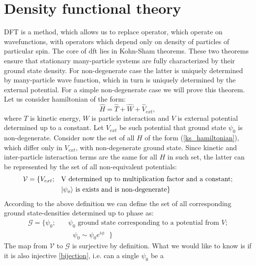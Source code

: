 \documentclass[openany, longbibliography,slovene,a4paper,12pt]{article}
\begin{document}
\section{Density functional theory}
DFT is a method, which allows us to replace operator, which operate on
wavefunctions, with operators which depend only on density of particles of
particular spin. The core of dft lies in Kohn-Sham theorems. These two theorems
ensure that stationary many-particle systems are fully characterized by their
ground state density. For non-degenerate case the latter is uniquely determined
by many-particle wave function, which in turn is uniquely determined by the
external potential. For a simple non-degenerate case we will prove this theorem. Let us consider hamiltonian of the form:
\begin{equation} \label{ks_hamiltonian}
\hat H = \hat T + \hat W + \hat V_{ext},
\end{equation}
where $T$ is kinetic energy, $W$ is particle interaction and $V$ is external
potential determined up to a constant. Let $V_{ext}$ be such potential that
ground state $\psi_0$ is non-degenerate. Consider now the set of all $H$ of the
form (\ref{ks_hamiltonian}), which
differ only in $V_{ext}$, with non-degenerate ground state. Since kinetic and
inter-particle interaction terms are the same for all $H$ in such set, the latter
can be represented by the set of all non-equivalent potentials:
\begin{equation}
  \begin{split}
    \mathcal{V} = \{V_{ext};\quad &\textrm{V determined up to multiplication factor and a constant;}\\
    & \textrm{$\ket{\psi_o}$ is exists and is non-degenerate}\}
    \end{split}
 \end{equation}
According to the above definition we can define the set of all corresponding
ground state-densities determined up to phase as:
\begin{equation}
  \begin{split}
    \mathcal{G} = \{\psi_0; \quad &\textrm{$\psi_0$ ground state corresponding to a potential from $V$;}\\
&\textrm{ $\psi_0\sim\psi_0e^{i\phi}$   }
    \}
    \end{split}
  \end{equation}
The map from $\mathcal{V}$ to $\mathcal{G}$ is surjective by definition. What we
would like to know is if it is also injective  \ref{bijection}, i.e. can a single $\psi_0$ be a
\end{document}
